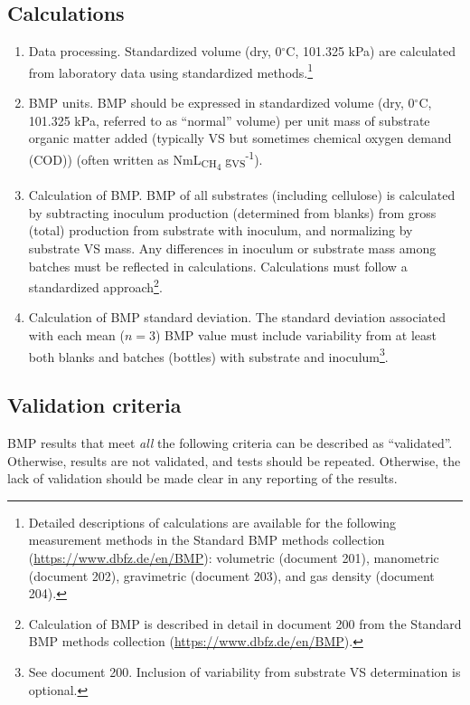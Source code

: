 \documentclass[]{article}
\begin{document}
\subsection{Calculations}
\label{sec:calculations}
\begin{enumerate}
  \item Data processing.
    Standardized  volume (dry, 0$^\circ$C, 101.325 kPa) are calculated from laboratory data using standardized methods.\footnote{
      Detailed descriptions of calculations are available for the following measurement methods in the Standard BMP methods collection (\url{https://www.dbfz.de/en/BMP}): volumetric (document 201), manometric (document 202), gravimetric (document 203), and gas density (document 204).
    }
  \item BMP units.
	  BMP should be expressed in standardized  volume (dry, 0$^\circ$C, 101.325 kPa, referred to as ``normal'' volume) per unit mass of substrate organic matter added (typically VS but sometimes chemical oxygen demand (COD)) (often written as NmL\textsubscript{CH\textsubscript{4}} g\textsubscript{VS}\textsuperscript{-1}). 
  \item Calculation of BMP.
    BMP of all substrates (including cellulose) is calculated by subtracting inoculum  production (determined from blanks) from gross (total)  production from substrate with inoculum, and normalizing by substrate VS mass.
    Any differences in inoculum or substrate mass among batches must be reflected in calculations.
    Calculations must follow a standardized approach\footnote{
      Calculation of BMP is described in detail in document 200 from the Standard BMP methods collection (\url{https://www.dbfz.de/en/BMP}).
    }.
  \item Calculation of BMP standard deviation.
    The standard deviation associated with each mean ($n = 3$) BMP value must include variability from at least both blanks and batches (bottles) with substrate and inoculum\footnote{
      See document 200. 
      Inclusion of variability from substrate VS determination is optional.
    }.
\end{enumerate}

\subsection{Validation criteria}
\label{sec:crit}
BMP results that meet \textit{all} the following criteria can be described as ``validated''.
Otherwise, results are not validated, and tests should be repeated. Otherwise, the lack of validation should be made clear in any reporting of the results.
\end{document}
